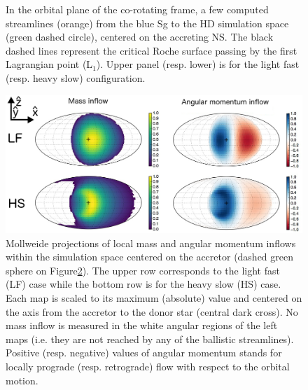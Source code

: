 \documentclass{aa}
\makeatletter
\newcommand*{\ie}{i.e.\@\xspace}
\makeatother
\begin{document}
\begin{figure}
\begin{subfigure}{.5\textwidth}
  \label{fig:sfig2}
\end{subfigure}
\caption{In the orbital plane of the co-rotating frame, a few computed streamlines (orange) from the blue Sg to the HD simulation space (green dashed circle), centered on the accreting NS. The black dashed lines represent the critical Roche surface passing by the first Lagrangian point (L$_1$). Upper panel (resp. lower) is for the light fast (resp. heavy slow) configuration.}
\label{fig:big_picture}
\end{figure} 

\begin{figure}[!b]
\centering
\includegraphics[width=2\columnwidth]{Pictures/inflow_maps.png}
\caption{Mollweide projections of local mass and angular momentum inflows within the simulation space centered on the accretor (dashed green sphere on Figure\ref{fig:big_picture}). The upper row corresponds to the light fast (LF) case while the bottom row is for the heavy slow (HS) case. Each map is scaled to its maximum (absolute) value and centered on the axis from the accretor to the donor star (central dark cross). No mass inflow is measured in the white angular regions of the left maps (\ie they are not reached by any of the ballistic streamlines). Positive (resp. negative) values of angular momentum stands for locally prograde (resp. retrograde) flow with respect to the orbital motion.}
\label{fig:inflow_maps}
\end{figure} 
\end{document}
